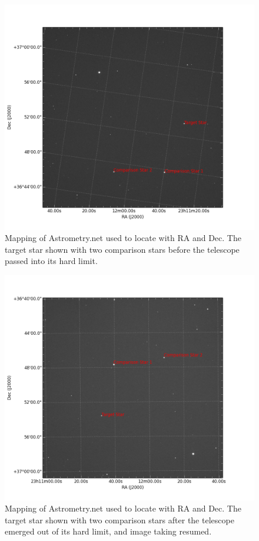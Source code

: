 \documentclass[12pt,twocolumn]{article}
\begin{document}
\begin{center}
\begin{figure}
\includegraphics[scale=0.35]{StarMap}
\caption{\small{Mapping of Astrometry.net used to locate with RA and Dec. The target star shown with two comparison stars before the telescope passed into its hard limit. }}
\end{figure}
\end{center}

\begin{center}
\begin{figure}
\includegraphics[scale= 0.35]{StarMap2}
\caption{\small{Mapping of Astrometry.net used to locate with RA and Dec. The target star shown with two comparison stars after the telescope emerged out of its hard limit, and image taking resumed.}}
\end{figure}
\end{center}
\end{document}
